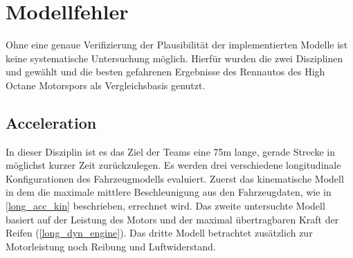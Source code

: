 \documentclass{like}
\begin{document}
\chapter{Modellfehler}
\label{modelError}
Ohne eine genaue Verifizierung der Plausibilität der implementierten Modelle ist keine systematische Untersuchung möglich. Hierfür wurden die zwei Disziplinen  und  gewählt und die besten gefahrenen Ergebnisse des Rennautos des High Octane Motorspors als Vergleichsbasis genutzt.


\section{Acceleration}
In dieser Disziplin ist es das Ziel der Teams eine 75m lange, gerade Strecke in möglichst kurzer Zeit zurückzulegen.
Es werden drei verschiedene longitudinale Konfigurationen des Fahrzeugmodells evaluiert. Zuerst das kinematische Modell in dem die maximale mittlere Beschleunigung aus den Fahrzeugdaten, wie in \ref{long_acc_kin} beschrieben, errechnet wird. Das zweite untersuchte Modell basiert auf der Leistung des Motors und der maximal übertragbaren Kraft der Reifen (\ref{long_dyn_engine}).
Das dritte Modell betrachtet zusätzlich zur Motorleistung noch Reibung und Luftwiderstand. 
\end{document}
